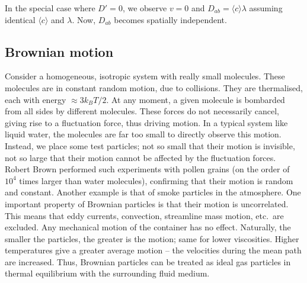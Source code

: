 \documentclass[11pt]{article}
\newcommand\E[1]{\langle #1 \rangle}
\theoremstyle{definition}
\theoremstyle{remark}
\numberwithin{equation}{section}
\begin{document}
    In the special case where $D' = 0$, we observe $v = 0$ and $D_{ab} =
    \E{c}\lambda$ assuming identical $\E{c}$ and $\lambda$. Now, $D_{ab}$ becomes
    spatially independent.

    \subsection{Brownian motion}
    Consider a homogeneous, isotropic system with really small molecules. These
    molecules are in constant random motion, due to collisions. They are
    thermalised, each with energy $\approx 3k_B T /2$. At any moment, a given
    molecule is bombarded from all sides by different molecules. These forces do not
    necessarily cancel, giving rise to a fluctuation force, thus driving motion.  In
    a typical system like liquid water, the molecules are far too small to directly
    observe this motion. Instead, we place some test particles; not so small that
    their motion is invisible, not so large that their motion cannot be affected by
    the fluctuation forces. Robert Brown performed such experiments with pollen
    grains (on the order of $10^4$ times larger than water molecules), confirming
    that their motion is random and constant. Another example is that of smoke
    particles in the atmosphere. One important property of Brownian particles is
    that their motion is uncorrelated. This means that eddy currents, convection, 
    streamline mass motion, etc.\ are excluded. Any mechanical motion of the
    container has no effect. Naturally, the smaller the particles, the greater is
    the motion; same for lower viscosities. Higher temperatures give a greater
    average motion -- the velocities during the mean path are increased. Thus,
    Brownian particles can be treated as ideal gas particles in thermal equilibrium
    with the surrounding fluid medium.
\end{document}
